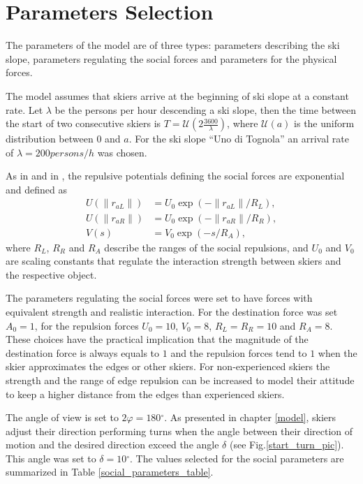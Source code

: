 \documentclass[12pt,a4paper,twoside]{book}
\newcommand{\norm}[1]{\lVert#1\rVert}
\newcommand{\degree}{\ensuremath{^\circ}}
\begin{document}
\section{Parameters Selection}
The parameters of the model are of three types: parameters describing the ski slope, parameters regulating the social forces and parameters for the physical forces.

The model assumes that skiers arrive at the beginning of ski slope at a constant rate. Let $\lambda$ be the persons per hour descending a ski slope, then the time between the start of two consecutive skiers is $T=\mathcal{U}\left(2\frac{3600}{\lambda}\right)$, where $\mathcal{U}(a)$ is the uniform distribution between $0$ and $a$. For the ski slope ``Uno di Tognola'' an arrival rate of $\lambda=200 persons/h$ was chosen.

As in \cite{hol2012} and in \cite{hel2008}, the repulsive potentials defining the social forces are exponential and defined as
\begin{align}
U(\norm{r_{aL}})&=U_0 \exp(-\norm{r_{aL}}/R_L), \\
U(\norm{r_{aR}})&=U_0 \exp(-\norm{r_{aR}}/R_R), \\
V(s)&=V_0 \exp(-s/R_A),
\end{align}
where $R_L$, $R_R$ and $R_A$ describe the ranges of the social repulsions, and $U_0$ and $V_0$ are scaling constants that regulate the interaction strength between skiers and the respective object.

The parameters regulating the social forces were set to have forces with equivalent strength and realistic interaction. For the destination force was set $A_0=1$, for the repulsion forces $U_0=10$, $V_0=8$, $R_L=R_R=10$ and $R_A=8$. These choices have the practical implication that the magnitude of the destination force is always equals to $1$ and the repulsion forces tend to $1$ when the skier approximates the edges or other skiers. For non-experienced skiers the strength and the range of edge repulsion can be increased to model their attitude to keep a higher distance from the edges than experienced skiers.

 The angle of view is set to $2\varphi=180\degree$. As presented in chapter \ref{model}, skiers adjust their direction performing turns when the angle between their direction of motion and the desired direction exceed the angle $\delta$ (see Fig.\ref{start_turn_pic}). This angle was set to $\delta=10\degree$. The values selected for the social parameters are summarized in Table \ref{social_parameters_table}.
\end{document}
